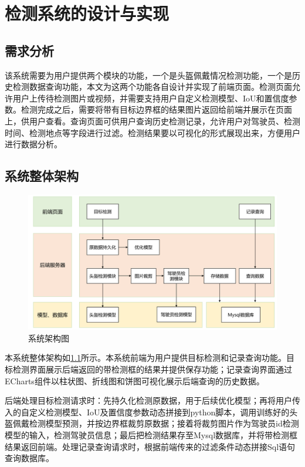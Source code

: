 \chapter{检测系统的设计与实现}

\section{需求分析}
该系统需要为用户提供两个模块的功能，一个是头盔佩戴情况检测功能，一个是历史检测数据查询功能，本文为这两个功能各自设计并实现了前端页面。检测页面允许用户上传待检测图片或视频，并需要支持用户自定义检测模型、IoU和置信度参数。检测完成之后，需要将带有目标边界框的结果图片返回给前端并展示在页面上，供用户查看。查询页面可供用户查询历史检测记录，允许用户对驾驶员、检测时间、检测地点等字段进行过滤。检测结果要以可视化的形式展现出来，方便用户进行数据分析。

\section{系统整体架构}
\begin{figure}[!htb]
    \centering
    \includegraphics[width=1\textwidth]{figs/chap05/struct.png}
    \caption{系统架构图}
    \label{fig:struct}
\end{figure}
本系统整体架构如\ref{fig:struct}所示。本系统前端为用户提供目标检测和记录查询功能。目标检测界面展示后端返回的带检测框的结果并提供保存功能；记录查询界面通过ECharts组件以柱状图、折线图和饼图可视化展示后端查询的历史数据。

后端处理目标检测请求时：先持久化检测原数据，用于后续优化模型；再将用户传入的自定义检测模型、IoU及置信度参数动态拼接到python脚本，调用训练好的头盔佩戴检测模型预测，并按边界框裁剪原数据；接着将裁剪图片作为驾驶员id检测模型的输入，检测驾驶员信息；最后把检测结果存至Mysql数据库，并将带检测框结果返回前端。处理记录查询请求时，根据前端传来的过滤条件动态拼接Sql语句查询数据库。

